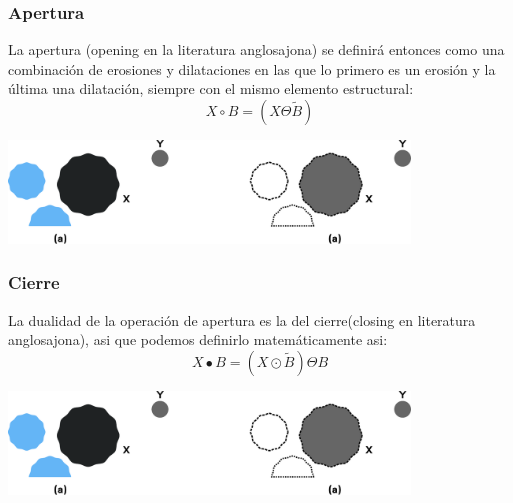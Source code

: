 \subsubsection{Apertura}
La
apertura (opening en la literatura anglosajona) se definirá entonces como una
combinación de erosiones y dilataciones en las que lo primero es un erosión y la última
una dilatación, siempre con el mismo elemento estructural:\cite{Book:Jose2005}
\begin{equation}
	X \circ B = (X \Theta \tilde{B})
\end{equation}
\begin{center}
	\includegraphics[width=0.8\textwidth]{Contenido/Cuerpo/Capitulo2/Fig16.eps}
	\label{fig:MarcoTeorico:Fig24}
\end{center}

\subsubsection{Cierre}
La dualidad de la operación de apertura es la del cierre(closing en literatura anglosajona), asi que podemos definirlo matemáticamente asi:
\begin{equation}
	X  \bullet B = (X \odot \tilde{B}) \Theta B
\end{equation}

\begin{center}
	\includegraphics[width=0.8\textwidth]{Contenido/Cuerpo/Capitulo2/Fig16.eps}
	\label{fig:MarcoTeorico:Fig25}
\end{center}

